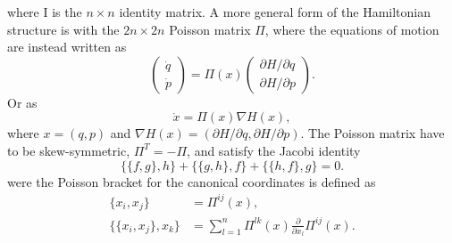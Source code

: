 \documentclass[english,master]{liumaiex}
\theoremstyle{plain}
\theoremstyle{definition}
\begin{document}
%
where I is the $n \times n$ identity matrix. A more general form of the Hamiltonian structure is with the $2n \times 2n$ Poisson matrix $\Pi$, where the equations of motion are instead written as
%
\begin{equation}
\begin{pmatrix}
	\dot{q} \\
	\dot{p}
\end{pmatrix} =
\Pi(x)
\begin{pmatrix}
	\partial H / \partial q \\
	\partial H / \partial p
\end{pmatrix}.
\end{equation}
%
Or as
%
\begin{equation}
	\dot{x} = \Pi(x) \nabla H(x),
\end{equation}
%
where $x = (q,p)$ and $\nabla H(x) = (\partial H / \partial q, \partial H / \partial p)$. The Poisson matrix have to be skew-symmetric, $\Pi^T = -\Pi$, and satisfy the Jacobi identity
\begin{equation}
	\{\{f,g\},h\} + \{\{g,h\},f\} + \{\{h,f\},g\} = 0.
\end{equation}
%
were the Poisson bracket for the canonical coordinates is defined as
%
\begin{align}
	\{x_i, x_j\} &= \Pi^{ij}(x), \\
	\{\{x_i, x_j\}, x_k\} &= \sum_{l=1}^n \Pi^{lk}(x) \frac{\partial}{\partial x_l} \Pi^{ij}(x).
\end{align}
\end{document}
